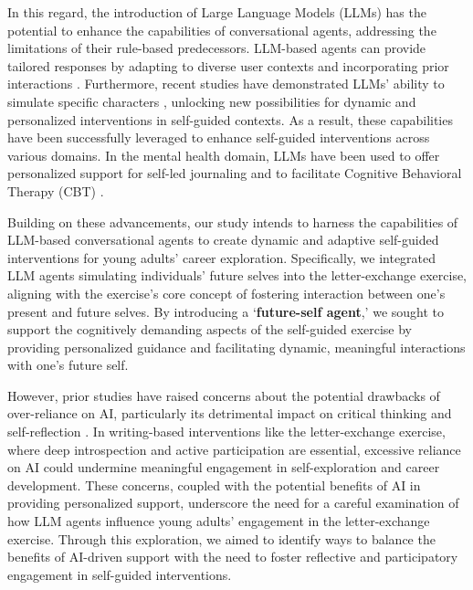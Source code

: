 In this regard, the introduction of Large Language Models (LLMs) has the potential to enhance the capabilities of conversational agents, addressing the limitations of their rule-based predecessors. LLM-based agents can provide tailored responses by adapting to diverse user contexts and incorporating prior interactions \cite{shukuri_meta-control_2023, 10.1145/3544548.3581503}. Furthermore, recent studies have demonstrated LLMs' ability to simulate specific characters \cite{cheong2022role, shao-etal-2023-character}, unlocking new possibilities for dynamic and personalized interventions in self-guided contexts. As a result, these capabilities have been successfully leveraged to enhance self-guided interventions across various domains. In the mental health domain, LLMs have been used to offer personalized support for self-led journaling \cite{10.1145/3613905.3650767} and to facilitate Cognitive Behavioral Therapy (CBT) \cite{na2024cbtllmchineselargelanguage}. 


Building on these advancements, our study intends to harness the capabilities of LLM-based conversational agents to create dynamic and adaptive self-guided interventions for young adults' career exploration. Specifically, we integrated LLM agents simulating individuals' future selves into the letter-exchange exercise, aligning with the exercise’s core concept of fostering interaction between one’s present and future selves. By introducing a `\textbf{future-self agent},’ we sought to support the cognitively demanding aspects of the self-guided exercise by providing personalized guidance and facilitating dynamic, meaningful interactions with one’s future self.

However, prior studies have raised concerns about the potential drawbacks of over-reliance on AI, particularly its detrimental impact on critical thinking and self-reflection \cite{darwin2024critical, zhai2024effects}. In writing-based interventions like the letter-exchange exercise, where deep introspection and active participation are essential, excessive reliance on AI could undermine meaningful engagement in self-exploration and career development. These concerns, coupled with the potential benefits of AI in providing personalized support, underscore the need for a careful examination of how LLM agents influence young adults' engagement in the letter-exchange exercise. Through this exploration, we aimed to identify ways to balance the benefits of AI-driven support with the need to foster reflective and participatory engagement in self-guided interventions.



